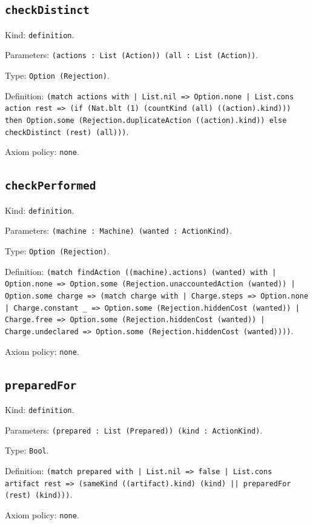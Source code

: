 \documentclass[11pt]{article}
\begin{document}
\subsection*{\texttt{checkDistinct}}
\noindent Kind: \texttt{definition}.\par
\noindent Parameters: \texttt{(actions : List (Action)) (all : List (Action))}.\par
\noindent Type: \texttt{Option (Rejection)}.\par
\noindent Definition: \texttt{(match actions with | List.nil => Option.none | List.cons action rest => (if (Nat.blt (1) (countKind (all) ((action).kind))) then Option.some (Rejection.duplicateAction ((action).kind)) else checkDistinct (rest) (all)))}.\par
\noindent Axiom policy: \texttt{none}.\par
\subsection*{\texttt{checkPerformed}}
\noindent Kind: \texttt{definition}.\par
\noindent Parameters: \texttt{(machine : Machine) (wanted : ActionKind)}.\par
\noindent Type: \texttt{Option (Rejection)}.\par
\noindent Definition: \texttt{(match findAction ((machine).actions) (wanted) with | Option.none => Option.some (Rejection.unaccountedAction (wanted)) | Option.some charge => (match charge with | Charge.steps => Option.none | Charge.constant \_ => Option.some (Rejection.hiddenCost (wanted)) | Charge.free => Option.some (Rejection.hiddenCost (wanted)) | Charge.undeclared => Option.some (Rejection.hiddenCost (wanted))))}.\par
\noindent Axiom policy: \texttt{none}.\par
\subsection*{\texttt{preparedFor}}
\noindent Kind: \texttt{definition}.\par
\noindent Parameters: \texttt{(prepared : List (Prepared)) (kind : ActionKind)}.\par
\noindent Type: \texttt{Bool}.\par
\noindent Definition: \texttt{(match prepared with | List.nil => false | List.cons artifact rest => (sameKind ((artifact).kind) (kind) || preparedFor (rest) (kind)))}.\par
\noindent Axiom policy: \texttt{none}.\par
\end{document}
